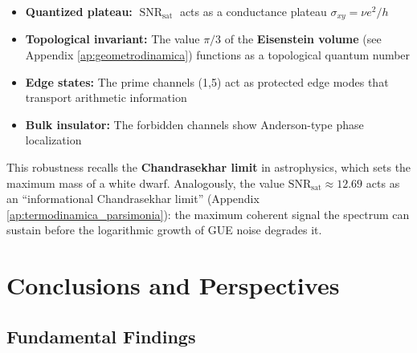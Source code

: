 \documentclass[12pt, a4paper]{article}
\theoremstyle{plain}
\theoremstyle{definition}
\theoremstyle{remark}
\newcommand{\SNR}{\operatorname{SNR}}
\begin{document}
\begin{itemize}
    \item \textbf{Quantized plateau:} $\SNR_{\text{sat}}$ acts as a 
          conductance plateau $\sigma_{xy} = \nu e^2/h$
    \item \textbf{Topological invariant:} The value $\pi/3$ of the \textbf{Eisenstein volume} (see Appendix \ref{ap:geometrodinamica}) functions as a topological quantum number
    \item \textbf{Edge states:} The prime channels (1,5) act as 
          protected edge modes that transport arithmetic information
    \item \textbf{Bulk insulator:} The forbidden channels show 
          Anderson-type phase localization
\end{itemize}

This robustness recalls the \textbf{Chandrasekhar limit} in astrophysics, which sets the maximum mass of a white dwarf. Analogously, the value $\mathrm{SNR}_{\mathrm{sat}} \approx 12.69$ acts as an ``informational Chandrasekhar limit'' (Appendix \ref{ap:termodinamica_parsimonia}): the maximum coherent signal the spectrum can sustain before the logarithmic growth of GUE noise degrades it.

\section{Conclusions and Perspectives}
\label{sec:conclusiones}

\subsection{Fundamental Findings}
\label{subsec:hallazgos}
\end{document}
